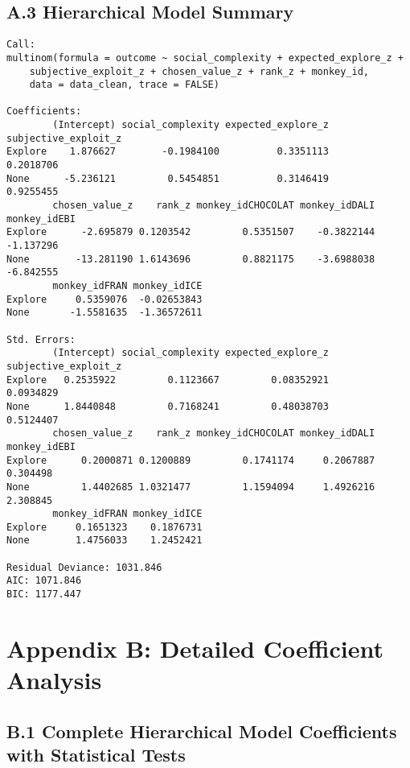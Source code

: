 \documentclass[11pt,a4paper]{article}
\begin{document}
\subsection{A.3 Hierarchical Model Summary}
\begin{verbatim}
Call:
multinom(formula = outcome ~ social_complexity + expected_explore_z + 
    subjective_exploit_z + chosen_value_z + rank_z + monkey_id, 
    data = data_clean, trace = FALSE)

Coefficients:
        (Intercept) social_complexity expected_explore_z subjective_exploit_z
Explore    1.876627        -0.1984100          0.3351113            0.2018706
None      -5.236121         0.5454851          0.3146419            0.9255455
        chosen_value_z    rank_z monkey_idCHOCOLAT monkey_idDALI monkey_idEBI
Explore      -2.695879 0.1203542         0.5351507    -0.3822144    -1.137296
None        -13.281190 1.6143696         0.8821175    -3.6988038    -6.842555
        monkey_idFRAN monkey_idICE
Explore     0.5359076  -0.02653843
None       -1.5581635  -1.36572611

Std. Errors:
        (Intercept) social_complexity expected_explore_z subjective_exploit_z
Explore   0.2535922         0.1123667         0.08352921            0.0934829
None      1.8440848         0.7168241         0.48038703            0.5124407
        chosen_value_z    rank_z monkey_idCHOCOLAT monkey_idDALI monkey_idEBI
Explore      0.2000871 0.1200889         0.1741174     0.2067887     0.304498
None         1.4402685 1.0321477         1.1594094     1.4926216     2.308845
        monkey_idFRAN monkey_idICE
Explore     0.1651323    0.1876731
None        1.4756033    1.2452421

Residual Deviance: 1031.846 
AIC: 1071.846 
BIC: 1177.447
\end{verbatim}

\section{Appendix B: Detailed Coefficient Analysis}

\subsection{B.1 Complete Hierarchical Model Coefficients with Statistical Tests}
\end{document}
